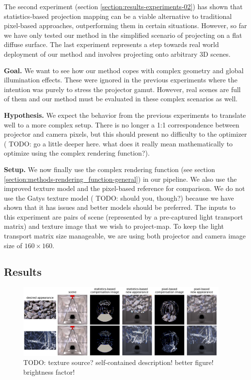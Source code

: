 The second experiment (section \ref{section:results-experiments-02}) has shown that statistics-based projection mapping can be a viable alternative to traditional pixel-based approaches, outperforming them in certain situations. However, so far we have only tested our method in the simplified scenario of projecting on a flat diffuse surface. The last experiment represents a step towards real world deployment of our method and involves projecting onto arbitrary 3D scenes.

\textbf{Goal.} We want to see how our method copes with complex geometry and global illumination effects. These were ignored in the previous experiments where the intention was purely to stress the projector gamut. However, real scenes are full of them and our method must be evaluated in these complex scenarios as well.

\textbf{Hypothesis.} We expect the behavior from the previous experiments to translate well to a more complex setup. There is no longer a 1:1 correspondence between projector and camera pixels, but this should present no difficulty to the optimizer ({\color{red} TODO: go a little deeper here. what does it really mean mathematically to optimize using the complex rendering function?}).

\textbf{Setup.} We now finally use the complex rendering function (see section \ref{section:methods-rendering_function-general}) in our pipeline. We also use the improved texture model and the pixel-based reference for comparison. We do not use the Gatys texture model ({\color{red} TODO: should you, though?}) because we have shown that it has issues and better models should be preferred. The inputs to this experiment are pairs of scene (represented by a pre-captured light transport matrix) and texture image that we wish to project-map. To keep the light transport matrix size manageable, we are using both projector and camera image size of \(160 \times 160\).

\subsection{Results}
\label{section:results-experiments-03-results}

\begin{figure}[ht]
    \begin{center}
        \includegraphics[width=0.95\textwidth]{images/ex03-ball-dof-crop.png}
        \caption{{\color{red} TODO: texture source? self-contained description! better figure! brightness factor!}}
        \label{fig:ex03-ball-dof}
    \end{center}
\end{figure}

